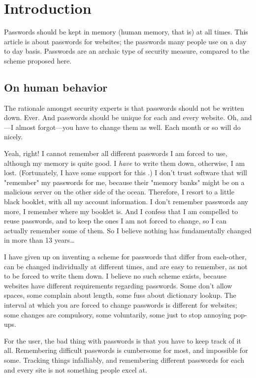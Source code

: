 \section{Introduction}
Passwords should be kept in memory (human memory, that is) at all times.
This article is about passwords for websites; the passwords many people use on a day to day basis.
Passwords are an archaic type of security measure, compared to the scheme proposed here.
\subsection{On human behavior}
The rationale amongst security experts is that passwords should not be written down.
Ever.
And passwords should be unique for each and every website.
Oh, and---I almost forgot---you have to change them as well.
Each month or so will do nicely. 
\par
Yeah, right!
I cannot remember all different passwords I am forced to use, although my memory is quite good.
I \emph{have} to write them down, otherwise, I am lost.
(Fortunately, I have some support for this \cite{Schneier:2005}.)
I don't trust software that will "remember" my passwords for me, because their "memory banks" might be on a malicious server on the other side of the ocean.
Therefore, I resort to a little black booklet, with all my account information.
I don't remember passwords any more, I remember where my booklet is.
And I confess that I am compelled to reuse passwords, and to keep the ones I am not forced to change, so I can actually remember some of them.
So I believe nothing has fundamentally changed in more than 13 years\ldots\cite{Adams:1999:UE:322796.322806}
\par
I have given up on inventing a scheme for passwords that differ from each-other,
can be changed individually at different times, 
and are easy to remember, as not to be forced to write them down.
I believe no such scheme exists, because websites have different requirements regarding passwords.
Some don't allow spaces, some complain about length, some fuss about dictionary lookup.
The interval at which you are forced to change passwords is different for websites;
some changes are compulsory, some voluntarily, some just to stop annoying pop-ups.
\par
For the user, the bad thing with passwords is that you have to keep track of it all.
Remembering difficult passwords is cumbersome for most, and impossible for some.
Tracking things infalliably, and remembering different passwords for each and every site is not something people excel at.
